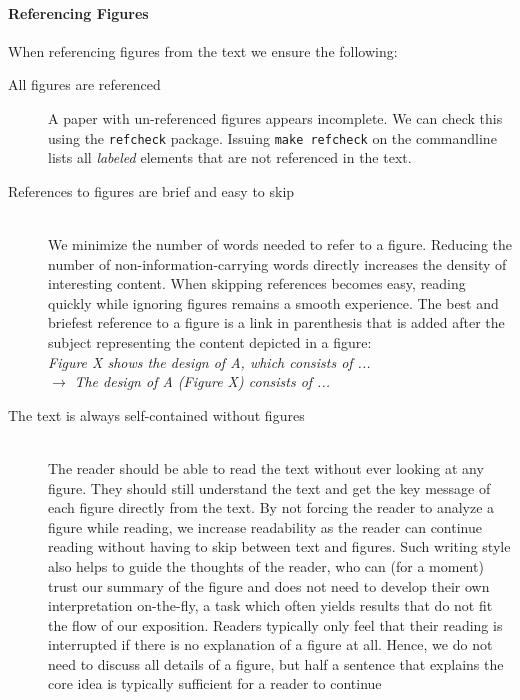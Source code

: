 \documentclass[review, anonymous, acmsmall]{acmart}
\newenvironment{draftonly}{}{}
\begin{document}
\begin{draftonly}
\paragraph{Referencing Figures} When referencing figures from the text we
ensure the following:
\begin{description}
      \item [All figures are referenced] A paper with un-referenced figures appears incomplete.
        We can check this using the \texttt{refcheck} package.
        Issuing \texttt{make refcheck} on the commandline lists all \emph{labeled} elements that are not referenced in the text.
      \item [References to figures are brief and easy to skip]~\\
                We minimize the number of words needed to refer to a figure. Reducing
                the number of non-information-carrying words directly increases
		the density of interesting content. When skipping references
		becomes easy, reading quickly while ignoring figures remains a
		smooth experience. The best and briefest reference to a figure
		is a link in parenthesis that is added after the subject
		representing the content depicted in a figure:\\
		{\color{pairedTwoDarkBlue}\textit{Figure
		X shows the design of A, which consists of ...}}\\
		$\to$ {\color{pairedFourDarkGreen}
		\textit{The design of A (Figure X) consists of ...}}
      \item [The text is always self-contained without figures] ~\\ The reader
                should be able to read the text without ever looking at any
                figure. They should still understand the text and get the key
		message of each figure directly from the text. By not forcing
		the reader to analyze a figure while reading, we increase
		readability as the reader can continue reading without having
		to skip between text and figures. Such writing style also helps
		to guide the thoughts of the reader, who can (for a moment)
		trust our summary of the figure and does not need to develop
		their own interpretation on-the-fly, a task which often yields
		results that do not fit the flow of our exposition. Readers
		typically only feel that their reading is interrupted if there
		is no explanation of a figure at all. Hence, we do not need to
		discuss all details of a figure, but half a sentence that explains the
		core idea is typically sufficient for a reader to continue

\end{description}
\end{draftonly}
\end{document}
